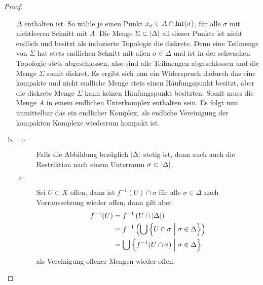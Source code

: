 \begin{Satz}
\begin{proof}
\begin{enumerate}[(a)]
            $\Delta$ enthalten ist. So wähle je einen Punkt
            $x_\sigma \in A \cap \operatorname{Int}(\sigma)$, für alle $\sigma$ mit
            nichtleeren Schnitt mit $A$. Die Menge
            $\Sigma \subset \left| \Delta \right|$ all dieser Punkte ist nicht
            endlich und besitzt als induzierte Topologie die
            diskrete. Denn eine Teilmenge von $\Sigma$ hat stets
            endlichen Schnitt mit allen $\sigma \in \Delta$ und ist in
            der schwachen Topologie stets abgeschlossen, also sind
            alle Teilmengen abgeschlossen und die Menge $\Sigma$ somit
            diskret. 
            Es ergibt sich nun ein Widerspruch dadurch das eine
            kompakte und nicht endliche Menge stets einen
            Häufungspunkt besitzt, aber die diskrete Menge $\Sigma$
            kann keinen Häufungspunkt besitzten.
            Somit muss die Menge $A$ in einem endlichen Unterkomplex
            enthalten sein. Es folgt nun unmittelbar das ein endlicher
            Komplex, als endliche Vereinigung der kompakten Komplexe
            wiederrum kompakt ist.
          \item 
            \begin{description}
            \item[\glqq $\Rightarrow$\grqq] Falls die Abbildung
              bezüglich $\left| \Delta \right|$ stetig ist, dann auch auch die
              Restriktion nach einem Unterraum
              $\sigma \subset \left| \Delta \right|$.
            \item[\glqq $\Leftarrow$ \grqq] Sei $U \subset X$ offen,
              dann ist $f^{-1}(U) \cap \sigma$ für alle
              $\sigma \in \Delta$ nach Vorraussetzung wieder offen,
              dann gilt aber
              \begin{align*}
                f^{-1}(U) &= f^{-1} \left(U \cap \left| \Delta \right| \right)\\ &=
                f^{-1} \left(\bigcup \left\{  U \cap \sigma  \; \Big| \;  \sigma \in
                    \Delta \right\} \right)\\ &= \bigcup \left\{  f^{-1}(U \cap
                  \sigma)  \; \Big| \;  \sigma \in \Delta \right\}
              \end{align*}
              als Vereinigung offener Mengen wieder offen.
            \end{description}
          \end{enumerate}
	\end{proof}
\end{Satz}

